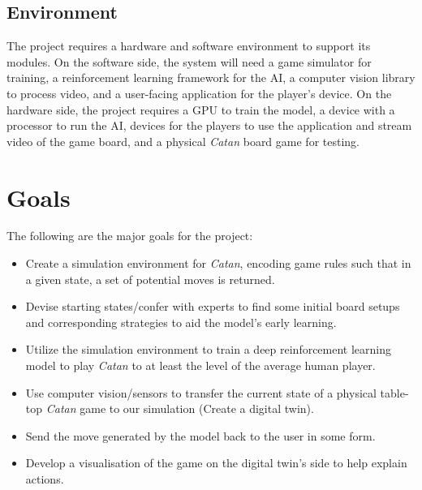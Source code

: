 \documentclass{article}
\begin{document}
\subsection{Environment}\label{subsec:environment}
The project requires a hardware and software environment to support its modules.
On the software side, the system will need a game simulator for training, a reinforcement learning framework for the AI, a computer vision library to process video, and a user-facing application for the player's device.
On the hardware side, the project requires a GPU to train the model, a device with a processor to run the AI, devices for the players to use the application and stream video of the game board, and a physical \emph{Catan} board game for testing.

\section{Goals}\label{sec:goals}
The following are the major goals for the project:
\begin{itemize}
    \item Create a simulation environment for \emph{Catan}, encoding game rules such that in a given state, a set of potential moves is returned.
    \item Devise starting states/confer with experts to find some initial board setups and corresponding strategies to aid the model’s early learning.
    \item Utilize the simulation environment to train a deep reinforcement learning model to play \emph{Catan} to at least the level of the average human player.
    \item Use computer vision/sensors to transfer the current state of a physical table-top \emph{Catan} game to our simulation (Create a digital twin).
    \item Send the move generated by the model back to the user in some form.
    \item Develop a visualisation of the game on the digital twin’s side to help explain actions.
\end{itemize}
\end{document}
